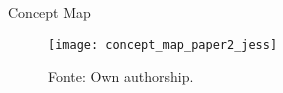 \begin{frame}[t]{Concept Map} 
    \begin{figure}
        \texttt{[image: concept\_map\_paper2\_jess]}
        \caption{Fonte: Own authorship.}
    \end{figure}
\end{frame}

